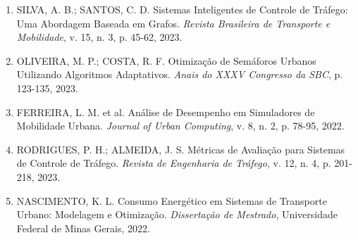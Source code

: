 \documentclass[12pt,a4paper]{article}
\begin{document}
\begin{enumerate}
    \item SILVA, A. B.; SANTOS, C. D. Sistemas Inteligentes de Controle de Tráfego: Uma Abordagem Baseada em Grafos. \textit{Revista Brasileira de Transporte e Mobilidade}, v. 15, n. 3, p. 45-62, 2023.
    
    \item OLIVEIRA, M. P.; COSTA, R. F. Otimização de Semáforos Urbanos Utilizando Algoritmos Adaptativos. \textit{Anais do XXXV Congresso da SBC}, p. 123-135, 2023.
    
    \item FERREIRA, L. M. et al. Análise de Desempenho em Simuladores de Mobilidade Urbana. \textit{Journal of Urban Computing}, v. 8, n. 2, p. 78-95, 2022.
    
    \item RODRIGUES, P. H.; ALMEIDA, J. S. Métricas de Avaliação para Sistemas de Controle de Tráfego. \textit{Revista de Engenharia de Tráfego}, v. 12, n. 4, p. 201-218, 2023.
    
    \item NASCIMENTO, K. L. Consumo Energético em Sistemas de Transporte Urbano: Modelagem e Otimização. \textit{Dissertação de Mestrado}, Universidade Federal de Minas Gerais, 2022.
\end{enumerate}
\end{document}
